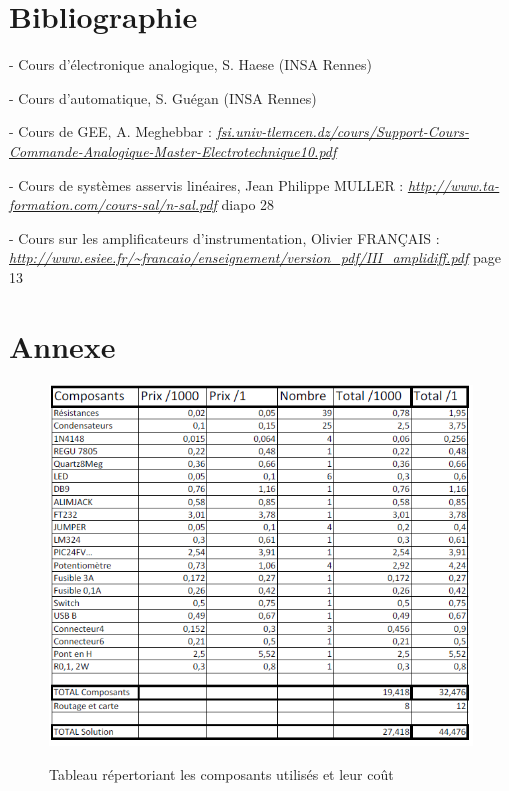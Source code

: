 \documentclass[11pt, french]{article} %
\begin{document}
\section{Bibliographie}
\medskip
- Cours d'électronique analogique, S. Haese (INSA Rennes)

- Cours d'automatique, S. Guégan (INSA Rennes)

- Cours de GEE, A. Meghebbar :
\newline \textit{\underline{\url{fsi.univ-tlemcen.dz/cours/Support-Cours-Commande-Analogique-Master-Electrotechnique10.pdf}}} 

- Cours de systèmes asservis linéaires, Jean Philippe MULLER : 
\newline \textit{\underline{\url{http://www.ta-formation.com/cours-sal/n-sal.pdf}}} diapo 28

- Cours sur les amplificateurs d'instrumentation, Olivier FRANÇAIS : 
\newline \textit{\underline{\url{http://www.esiee.fr/~francaio/enseignement/version_pdf/III_amplidiff.pdf}}} page 13

\pagebreak
\section{Annexe}
\medskip
\begin{figure}[!h]
	\centering
	\includegraphics[width=15cm]{SolutionAnalogique/cout.png}
	\label{cout}
	\caption{Tableau répertoriant les composants utilisés et leur coût}
\end{figure}
\end{document}
